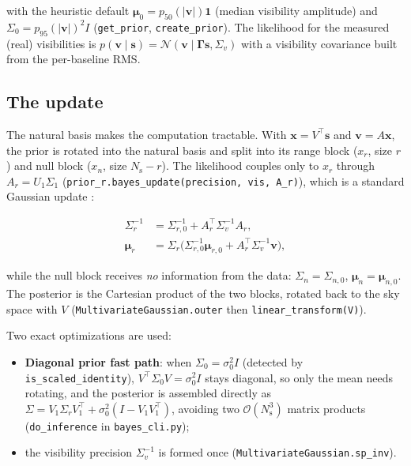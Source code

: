 \documentclass[11pt,a4paper]{article}
\newcommand{\Ns}{N_{\mathrm{s}}}
\newcommand{\Gammam}{\boldsymbol{\Gamma}}
\newcommand{\svec}{\boldsymbol{s}}
\newcommand{\vvec}{\boldsymbol{v}}
\begin{document}
with the heuristic default
$\boldsymbol{\mu}_0=p_{50}(|\vvec|)\mathbf{1}$ (median visibility amplitude)
and $\Sigma_0=p_{95}(|\vvec|)^2 I$ (\texttt{get\_prior},
\texttt{create\_prior}). The likelihood for the measured (real) visibilities is
$p(\vvec\mid\svec)=\mathcal{N}(\vvec\mid\Gammam\svec,\Sigma_v)$ with a
visibility covariance built from the per-baseline RMS.

\subsection{The update}

The natural basis makes the computation tractable. With
$\boldsymbol{x}=V^{\!\top}\svec$ and $\vvec=A\boldsymbol{x}$, the prior is
rotated into the natural basis and split into its range block
($x_r$, size $r$) and null block ($x_n$, size $\Ns-r$). The likelihood
couples only to $x_r$ through $A_r=U_1\Sigma_1$
(\texttt{prior\_r.bayes\_update(precision, vis, A\_r)}), which is a standard
Gaussian update \cite{bishop2006}:

\begin{align}
  \Sigma_r^{-1} &= \Sigma_{r,0}^{-1} + A_r^{\!\top}\Sigma_v^{-1} A_r,\\
  \boldsymbol{\mu}_r &= \Sigma_r \big(\Sigma_{r,0}^{-1}\boldsymbol{\mu}_{r,0}
  + A_r^{\!\top}\Sigma_v^{-1}\vvec\big),
\end{align}

while the null block receives \emph{no} information from the data:
$\Sigma_n=\Sigma_{n,0}$, $\boldsymbol{\mu}_n=\boldsymbol{\mu}_{n,0}$. The
posterior is the Cartesian product of the two blocks, rotated back to the sky
space with $V$ (\texttt{MultivariateGaussian.outer} then
\texttt{linear\_transform(V)}).

Two exact optimizations are used:

\begin{itemize}
  \item \textbf{Diagonal prior fast path}: when
    $\Sigma_0=\sigma_0^2 I$ (detected by
    \texttt{is\_scaled\_identity}), $V^{\!\top}\Sigma_0 V=\sigma_0^2 I$
    stays diagonal, so only the mean needs rotating, and the posterior is
    assembled directly as
    $\Sigma = V_1\Sigma_r V_1^{\!\top}+ \sigma_0^2(I-V_1V_1^{\!\top})$,
    avoiding two $\mathcal{O}(\Ns^3)$ matrix products
    (\texttt{do\_inference} in \texttt{bayes\_cli.py});
  \item the visibility precision $\Sigma_v^{-1}$ is formed once
    (\texttt{MultivariateGaussian.sp\_inv}).
\end{itemize}
\end{document}
